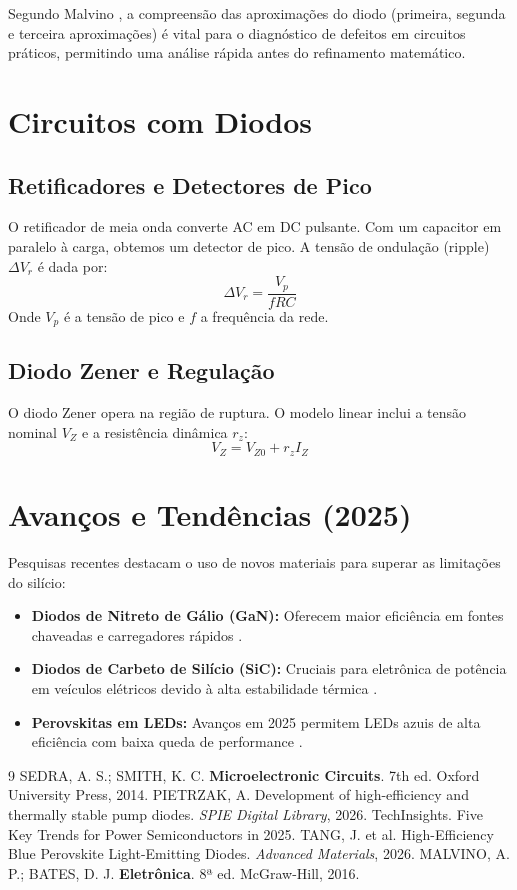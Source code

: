 \documentclass[12pt,a4paper]{article}
\begin{document}
Segundo Malvino \cite{malvino}, a compreensão das aproximações do diodo (primeira, segunda e terceira aproximações) é vital para o diagnóstico de defeitos em circuitos práticos, permitindo uma análise rápida antes do refinamento matemático.

\section{Circuitos com Diodos}
\subsection{Retificadores e Detectores de Pico}
O retificador de meia onda converte AC em DC pulsante. Com um capacitor em paralelo à carga, obtemos um detector de pico. A tensão de ondulação (ripple) $\Delta V_r$ é dada por:
\begin{equation}
\Delta V_r = \frac{V_p}{f R C}
\end{equation}
Onde $V_p$ é a tensão de pico e $f$ a frequência da rede.

\subsection{Diodo Zener e Regulação}
O diodo Zener opera na região de ruptura. O modelo linear inclui a tensão nominal $V_Z$ e a resistência dinâmica $r_z$:
\begin{equation}
V_Z = V_{Z0} + r_z I_Z
\end{equation}

\section{Avanços e Tendências (2025)}
Pesquisas recentes destacam o uso de novos materiais para superar as limitações do silício:
\begin{itemize}
    \item \textbf{Diodos de Nitreto de Gálio (GaN):} Oferecem maior eficiência em fontes chaveadas e carregadores rápidos \cite{gan2025}.
    \item \textbf{Diodos de Carbeto de Silício (SiC):} Cruciais para eletrônica de potência em veículos elétricos devido à alta estabilidade térmica \cite{sic2025}.
    \item \textbf{Perovskitas em LEDs:} Avanços em 2025 permitem LEDs azuis de alta eficiência com baixa queda de performance \cite{perovskite2025}.
\end{itemize}

\begin{thebibliography}{9}
 SEDRA, A. S.; SMITH, K. C. \textbf{Microelectronic Circuits}. 7th ed. Oxford University Press, 2014.
 PIETRZAK, A. Development of high-efficiency and thermally stable pump diodes. \textit{SPIE Digital Library}, 2026.
 TechInsights. Five Key Trends for Power Semiconductors in 2025.
 TANG, J. et al. High-Efficiency Blue Perovskite Light-Emitting Diodes. \textit{Advanced Materials}, 2026.
 MALVINO, A. P.; BATES, D. J. \textbf{Eletrônica}. 8ª ed. McGraw-Hill, 2016.
\end{thebibliography}
\end{document}
